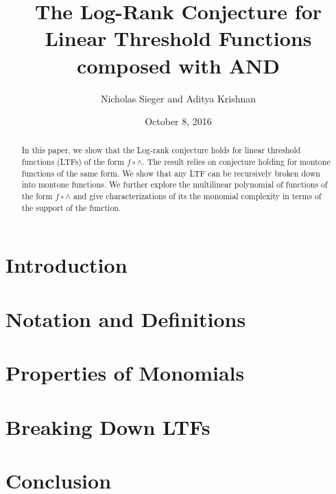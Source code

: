 \documentclass[a4paper]{article}
\title{The Log-Rank Conjecture for Linear Threshold Functions composed with AND}
\author{Nicholas Sieger and Aditya Krishnan}
\date{October 8, 2016}
\begin{document}
	\maketitle
	\begin{abstract}
		In this paper, we show that the Log-rank conjecture holds for linear threshold functions (LTFs) of the form $f \circ \wedge$. The result relies on conjecture holding for montone functions of the same form. We show that any LTF can be recursively broken down into montone functions. We further explore the multilinear polynomial of functions of the form $f \circ \wedge$ and give characterizations of its the monomial complexity in terms of the support of the function. 
	\end{abstract}
	\section{Introduction}
	\section{Notation and Definitions}
	
	\section{Properties of Monomials}
	\section{Breaking Down LTFs}
	
	\section{Conclusion}
	
	
\end{document}
